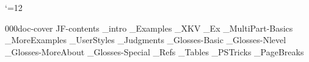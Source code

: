 



 \catcode`\@=12










\get 000doc-cover
\get JF-contents
_intro
_Examples
_XKV
_Ex
_MultiPart-Basics
_MoreExamples
_UserStyles
_Judgments
_Glosses-Basic
_Glosses-Nlevel
_Glosses-MoreAbout
_Glosses-Special
_Refs
_Tables
_PSTricks
_PageBreaks
 \bye
%
\bye

